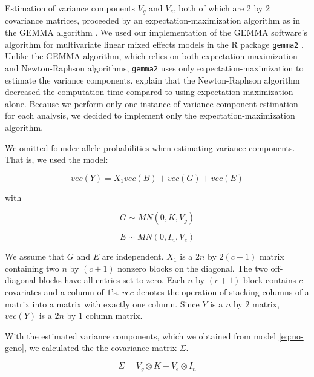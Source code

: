 \documentclass[oneside]{book}
\begin{document}

Estimation of variance components $V_g$ and $V_e$, both of which are 2 by 2 covariance matrices, proceeded by an expectation-maximization algorithm as in the GEMMA algorithm \citep{zhou2014efficient}. We used our implementation of the GEMMA software's algorithm for multivariate linear mixed effects models in the R package \texttt{gemma2} \citep{gemma2}. Unlike the GEMMA algorithm, which relies on both expectation-maximization and Newton-Raphson algorithms, \texttt{gemma2} uses only expectation-maximization to estimate the variance components. \citet{zhou2014efficient} explain that the Newton-Raphson algorithm decreased the computation time compared to using expectation-maximization alone. Because we perform only one instance of variance component estimation for each analysis, we decided to implement only the expectation-maximization algorithm. 

We omitted founder allele probabilities when estimating variance components. That is, we used the model:

\begin{equation}
vec(Y) = X_1 vec(B) + vec(G) + vec(E)
\label{eq:no-geno}
\end{equation}

with 

\begin{equation}
G \sim MN(0, K, V_g)
\end{equation}

\begin{equation}
E \sim MN(0, I_n, V_e)
\end{equation}

We assume that $G$ and $E$ are independent. $X_1$ is a $2n$ by $2(c + 1)$ matrix containing two $n$ by $(c + 1)$ nonzero blocks on the diagonal. The two off-diagonal blocks have all entries set to zero. Each $n$ by $(c + 1)$ block contains $c$ covariates and a column of $1$'s. $vec$ denotes the operation of stacking columns of a matrix into a matrix with exactly one column. Since $Y$ is a $n$ by $2$ matrix, $vec(Y)$ is a $2n$ by $1$ column matrix.


With the estimated variance components, which we obtained from model \ref{eq:no-geno}, we calculated the the covariance matrix $\Sigma$.

\begin{equation}
\Sigma = V_g \otimes K + V_e \otimes I_n
\end{equation}
\end{document}
